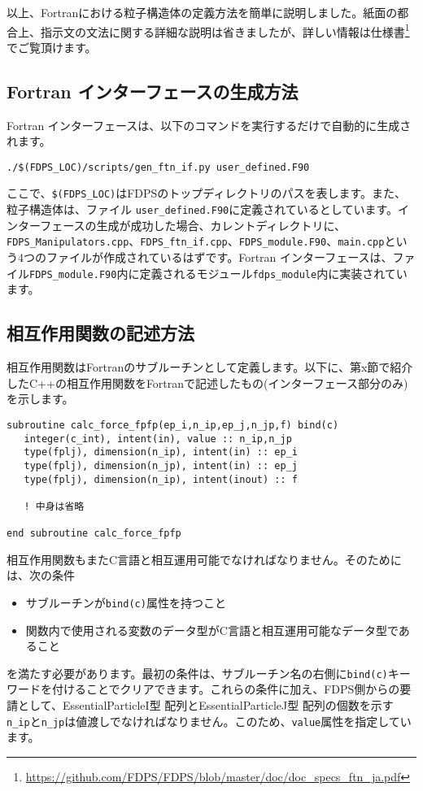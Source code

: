 \documentclass[twocolumn,10pt]{jarticle}
\begin{document}
以上、Fortranにおける粒子構造体の定義方法を簡単に説明しました。紙面の都合上、指示文の文法に関する詳細な説明は省きましたが、詳しい情報は仕様書\footnote{\url{https://github.com/FDPS/FDPS/blob/master/doc/doc_specs_ftn_ja.pdf}}でご覧頂けます。

\subsection{Fortran インターフェースの生成方法}\label{subsec:how_to_gen_if}
Fortran インターフェースは、以下のコマンドを実行するだけで自動的に生成されます。
{\footnotesize
\begin{verbatim}
./$(FDPS_LOC)/scripts/gen_ftn_if.py user_defined.F90
\end{verbatim}
}\noindent
ここで、\texttt{\$(FDPS\_LOC)}はFDPSのトップディレクトリのパスを表します。また、粒子構造体は、ファイル \texttt{user\_defined.F90}に定義されているとしています。インターフェースの生成が成功した場合、カレントディレクトリに、\texttt{FDPS\_Manipulators.cpp}、\texttt{FDPS\_ftn\_if.cpp}、\texttt{FDPS\_module.F90}、\texttt{main.cpp}という4つのファイルが作成されているはずです。Fortran インターフェースは、ファイル\texttt{FDPS\_module.F90}内に定義されるモジュール\texttt{fdps\_module}内に実装されています。

\subsection{相互作用関数の記述方法}\label{subsec:how_to_def_interact_func}
相互作用関数はFortranのサブルーチンとして定義します。以下に、第x節で紹介したC++の相互作用関数をFortranで記述したもの(インターフェース部分のみ)を示します。
{\scriptsize
\begin{verbatim}
subroutine calc_force_fpfp(ep_i,n_ip,ep_j,n_jp,f) bind(c)
   integer(c_int), intent(in), value :: n_ip,n_jp
   type(fplj), dimension(n_ip), intent(in) :: ep_i
   type(fplj), dimension(n_jp), intent(in) :: ep_j
   type(fplj), dimension(n_ip), intent(inout) :: f
   
   ! 中身は省略
   
end subroutine calc_force_fpfp
\end{verbatim}
}\noindent
相互作用関数もまたC言語と相互運用可能でなければなりません。そのためには、次の条件
\begin{itemize}
\item サブルーチンが\texttt{bind(c)}属性を持つこと
\item 関数内で使用される変数のデータ型がC言語と相互運用可能なデータ型であること
\end{itemize}
を満たす必要があります。最初の条件は、サブルーチン名の右側に\texttt{bind(c)}キーワードを付けることでクリアできます。これらの条件に加え、FDPS側からの要請として、EssentialParticleI型 配列とEssentialParticleJ型 配列の個数を示す\texttt{n\_ip}と\texttt{n\_jp}は値渡しでなければなりません。このため、\texttt{value}属性を指定しています。
\end{document}
